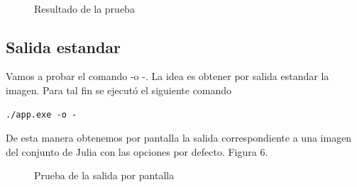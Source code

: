\documentclass [12pt, a4paper]{article}
\begin{document}
	\begin{figure}[h]
	\centering
	\\
	\caption{Resultado de la prueba}
	\label{result5}
\end{figure}

	\subsection{Salida estandar}
	Vamos a probar el comando -o -. La idea es obtener por salida estandar la imagen. Para tal fin se ejecutó el siguiente comando
	\begin{lstlisting}[frame=simple,stepnumber=0]
./app.exe -o -
	\end{lstlisting}
	De esta manera obtenemos por pantalla la salida correspondiente a una imagen del conjunto de Julia con las opciones por defecto. Figura 6.
	
	\begin{figure}[h]
		\centering
		\caption{Prueba de la salida por pantalla}
		\label{result6}
	\end{figure}
	
\end{document}
